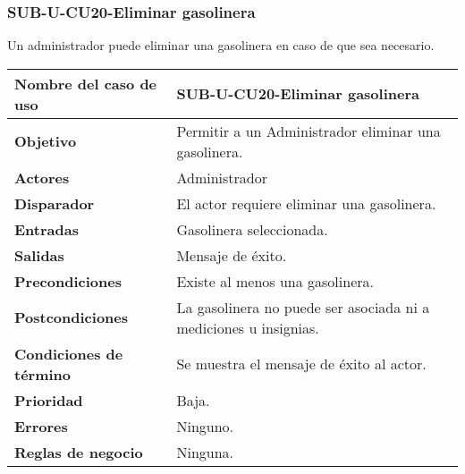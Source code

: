 \subsubsection{SUB-U-CU20-Eliminar gasolinera}\label{SUB-U-CU20}
Un administrador puede eliminar una gasolinera en caso de que sea necesario.

\begin{longtable}{|J{5cm}|J{10.3cm}|}
	\hline
	\textbf{Nombre del caso de uso} &
		SUB-U-CU20-Eliminar gasolinera \\ \hline
	\textbf{Objetivo} &
		Permitir a un Administrador eliminar una gasolinera. \\ \hline
	\textbf{Actores} &
		Administrador \\ \hline 
	\textbf{Disparador} & 
		El actor requiere eliminar una gasolinera. \\ \hline 
	\textbf{Entradas} & Gasolinera seleccionada.
		\\ \hline 
	\textbf{Salidas} & Mensaje de éxito.
		\\ \hline
	\textbf{Precondiciones} & Existe al menos una gasolinera.
		\\ \hline
	\textbf{Postcondiciones} & La gasolinera no puede ser asociada ni a mediciones u insignias.
		\\ \hline
	\textbf{Condiciones de término} & Se muestra el mensaje de éxito al actor.
		\\ \hline 
	\textbf{Prioridad} & 
		Baja. \\ \hline
	\textbf{Errores} & Ninguno.
		\\ \hline
	\textbf{Reglas de negocio} & Ninguna.
		 \\ \hline
\end{longtable}

